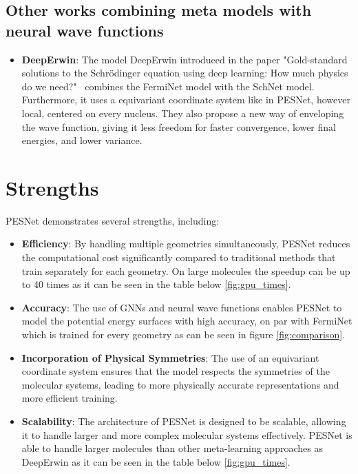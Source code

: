 \documentclass{article}
\begin{document}
\subsection{Other works combining meta models with neural wave functions}
\begin{itemize}
    \item \textbf{DeepErwin}: The model DeepErwin introduced in the paper "Gold-standard solutions to the Schrödinger equation using deep learning: How much physics do we need?"~\cite{gerardDeepErwin} combines the FermiNet model with the SchNet model. Furthermore, it uses a equivariant coordinate system like in PESNet, however local, centered on every nucleus. They also propose a new way of enveloping the wave function, giving it less freedom for faster convergence, lower final energies, and lower variance.
\end{itemize}

\section{Strengths}
PESNet demonstrates several strengths, including:
\begin{itemize}
    \item \textbf{Efficiency}: By handling multiple geometries simultaneously, PESNet reduces the computational cost significantly compared to traditional methods that train separately for each geometry. On large molecules the speedup can be up to 40 times as it can be seen in the table below \ref{fig:gpu_times}.
    \item \textbf{Accuracy}: The use of GNNs and neural wave functions enables PESNet to model the potential energy surfaces with high accuracy, on par with FermiNet which is trained for every geometry as can be seen in figure \ref{fig:comparison}.
    \item \textbf{Incorporation of Physical Symmetries}: The use of an equivariant coordinate system ensures that the model respects the symmetries of the molecular systems, leading to more physically accurate representations and more efficient training.
    \item \textbf{Scalability}: The architecture of PESNet is designed to be scalable, allowing it to handle larger and more complex molecular systems effectively. PESNet is able to handle larger molecules than other meta-learning approaches as DeepErwin as it can be seen in the table below \ref{fig:gpu_times}.
\end{itemize}
\end{document}
